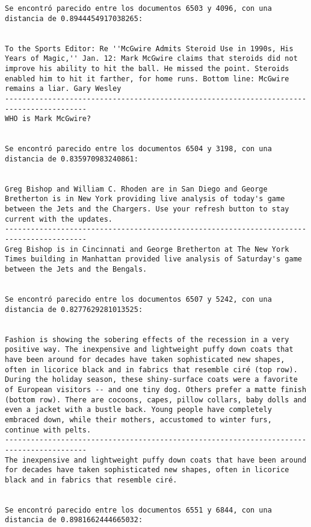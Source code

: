 \documentclass[11pt]{article}
\begin{document}
\begin{Verbatim}[commandchars=\\\{\}]
Se encontró parecido entre los documentos 6503 y 4096, con una distancia de 0.8944454917038265:


To the Sports Editor: Re ''McGwire Admits Steroid Use in 1990s, His Years of Magic,'' Jan. 12: Mark McGwire claims that steroids did not improve his ability to hit the ball. He missed the point. Steroids enabled him to hit it farther, for home runs. Bottom line: McGwire remains a liar. Gary Wesley
-----------------------------------------------------------------------------------------
WHO is Mark McGwire?


Se encontró parecido entre los documentos 6504 y 3198, con una distancia de 0.835970983240861:


Greg Bishop and William C. Rhoden are in San Diego and George Bretherton is in New York providing live analysis of today's game between the Jets and the Chargers. Use your refresh button to stay current with the updates.
-----------------------------------------------------------------------------------------
Greg Bishop is in Cincinnati and George Bretherton at The New York Times building in Manhattan provided live analysis of Saturday's game between the Jets and the Bengals.


Se encontró parecido entre los documentos 6507 y 5242, con una distancia de 0.8277629281013525:


Fashion is showing the sobering effects of the recession in a very positive way. The inexpensive and lightweight puffy down coats that have been around for decades have taken sophisticated new shapes, often in licorice black and in fabrics that resemble ciré (top row). During the holiday season, these shiny-surface coats were a favorite of European visitors -- and one tiny dog. Others prefer a matte finish (bottom row). There are cocoons, capes, pillow collars, baby dolls and even a jacket with a bustle back. Young people have completely embraced down, while their mothers, accustomed to winter furs, continue with pelts.
-----------------------------------------------------------------------------------------
The inexpensive and lightweight puffy down coats that have been around for decades have taken sophisticated new shapes, often in licorice black and in fabrics that resemble ciré.


Se encontró parecido entre los documentos 6551 y 6844, con una distancia de 0.8981662444665032:



\end{Verbatim}
\end{document}
